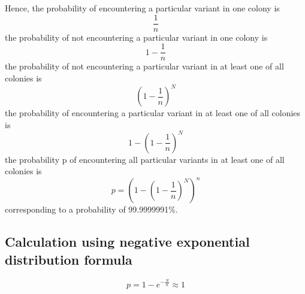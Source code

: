 \documentclass{article}
\begin{document}
	Hence, the probability of encountering a particular variant in one colony is
	\begin{equation}
	\frac{1}{n}
	\end{equation}
	the probability of not encountering a particular variant in one colony is
	\begin{equation}
	1-\frac{1}{n}
	\end{equation}
	the probability of not encountering a particular variant in at least one of all colonies is
	\begin{equation}
	(1-\frac{1}{n})^N
	\end{equation}
	the probability of encountering a particular variant in at least one of all colonies is
	\begin{equation}
	1-(1-\frac{1}{n})^N
	\end{equation}
	the probability p of encountering all particular variants in at least one of all colonies is
	\begin{equation}
	p = (1-(1-\frac{1}{n})^N)^n
	\end{equation}
	corresponding to a probability of 99.9999991\%.
	
	\subsection{Calculation using negative exponential distribution formula}
	
	\begin{equation}
	p = 1-e^{-\frac{N}{n}} \approx 1
	\end{equation}
	
	\newpage
\end{document}
